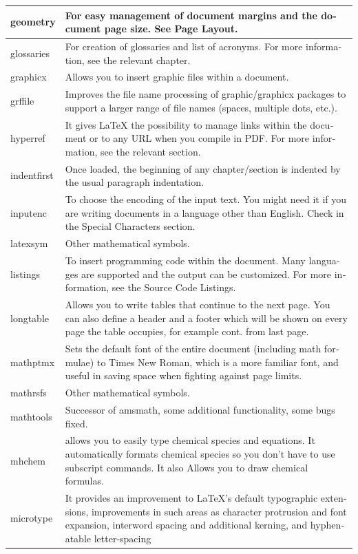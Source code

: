 \begin{latin}
\begin{longtable}{| p{} | p{} |}
geometry &For easy management of document margins and the document page size. See Page Layout.\\\hline
glossaries &For creation of glossaries and list of acronyms. For more information, see the relevant chapter.\\\hline
graphicx &Allows you to insert graphic files within a document.\\\hline
grffile &Improves the file name pro­cess­ing of graphic/graphicx pack­ages to sup­port a larger range of file names (spaces, multiple dots, etc.).\\\hline
hyperref &It gives LaTeX the possibility to manage links within the document or to any URL when you compile in PDF. For more information, see the relevant section.\\\hline
indentfirst &Once loaded, the beginning of any chapter/section is indented by the usual paragraph indentation.\\\hline
inputenc &To choose the encoding of the input text. You might need it if you are writing documents in a language other than English. Check in the Special Characters section.\\\hline
latexsym &Other mathematical symbols.\\\hline
listings &To insert programming code within the document. Many languages are supported and the output can be customized. For more information, see the Source Code Listings.\\\hline
longtable &Al­lows you to write ta­bles that con­tinue to the next page. You can also define a header and a footer which will be shown on every page the table occupies, for example cont. from last page.\\\hline
mathptmx &Sets the default font of the entire document (including math formulae) to Times New Roman, which is a more familiar font, and useful in saving space when fighting against page limits.\\\hline
mathrsfs &Other mathematical symbols.\\\hline
mathtools &Successor of amsmath, some additional functionality, some bugs fixed.\\\hline
mhchem &allows you to easily type chemical species and equations. It automatically formats chemical species so you don't have to use subscript commands. It also Allows you to draw chemical formulas.\\\hline
microtype &It provides an improvement to LaTeX's default ty­po­graphic ex­ten­sions, improvements in such areas as char­ac­ter pro­tru­sion and font ex­pan­sion, in­ter­word spac­ing and ad­di­tional kern­ing, and hy­phen­at­able letter-spacing\\\hline

\end{longtable}
\end{latin}
